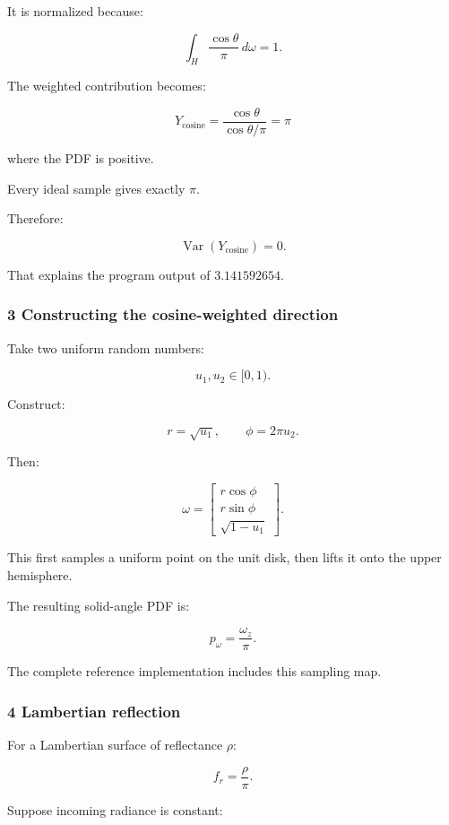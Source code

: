 It is normalized because:

\[
 \int_H\frac{\cos\theta}{\pi}\,d\omega=1.
\]

The weighted contribution becomes:

\[
 Y_{\mathrm{cosine}} = \frac{\cos\theta}{\cos\theta/\pi} =\boxed{\pi}
\]

where the PDF is positive.

Every ideal sample gives exactly \(\pi\).

Therefore:

\[
 \boxed{ \operatorname{Var}(Y_{\mathrm{cosine}})=0 }.
\]

That explains the program output of \(3.141592654\).

\subsubsection{3 Constructing the cosine-weighted direction}\label{02-foundations-ii-ch031-constructing-the-cosine-weighted-direction}

Take two uniform random numbers:

\[
 u_1,u_2\in[0,1).
\]

Construct:

\[
 r=\sqrt{u_1}, \qquad \phi=2\pi u_2.
\]

Then:

\[
 \boxed{ \omega= \begin{bmatrix} r\cos\phi\\ r\sin\phi\\ \sqrt{1-u_1} \end{bmatrix} }.
\]

This first samples a uniform point on the unit disk, then lifts it onto the upper hemisphere.

The resulting solid-angle PDF is:

\[
 \boxed{ p_\omega=\frac{\omega_z}{\pi} }.
\]

The complete reference implementation includes this sampling map.

\subsubsection{4 Lambertian reflection}\label{02-foundations-ii-ch031-lambertian-reflection}

For a Lambertian surface of reflectance \(\rho\):

\[
 f_r=\frac\rho\pi.
\]

Suppose incoming radiance is constant:

